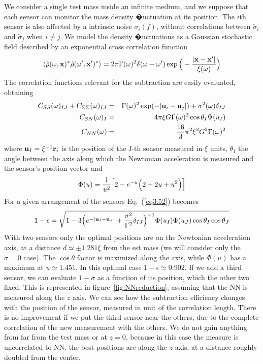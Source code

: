We consider a single test mass inside an infinite medium, and we suppose that each sensor can monitor the mass density �uctuation at its position. The $i$th sensor is also affected by a intrinsic noise $\sigma_{i}(f)$, without correlations between $\tilde{\sigma}_{i}$ and $\tilde{\sigma}_{j}$ when $i\neq j$. We model the density �uctuations as a Gaussian stochastic field described by an exponential cross correlation function
\begin{eqnarray}
		\langle\tilde{\rho}(\omega,{\bf x})^{*}\tilde{\rho}(\omega',{\bf x}')^{*}\rangle=2\pi\Gamma(\omega)^{2}\delta(\omega-\omega')\exp\Big{(}-\frac{|{\bf x}-{\bf x'}|}{\xi(\omega)}\Big{)}
		\label{eq3.53}
\end{eqnarray}
The correlation functions relevant for the subtraction are easily evaluated, obtaining
\begin{eqnarray}
		C_{SS}(\omega)_{IJ}+C_{\Sigma\Sigma}(\omega)_{IJ}&=&\Gamma(\omega)^{2}\exp(-|{\bf u}_{i}-{\bf u}_{j}|)+\sigma^{2}(\omega)\delta_{IJ}\\
		C_{SN}(\omega)_{I}&=&4\pi\xi G\Gamma(\omega)^{2}\cos\theta_{I}\Psi(u_{I})\\
		C_{NN}(\omega)&=&\frac{16}{3}\pi^{2}\xi^{2}G^{2}\Gamma(\omega)^{2}
		\label{eq3.54}
\end{eqnarray}
where ${\bf u}_{I}=\xi^{-1}{\bf r}_{i}$ is the position of the $I$-th sensor measured in $\xi$ units, $\theta_{I}$ the angle between the axis along which the Newtonian acceleration is measured and the sensor's position vector and
\begin{eqnarray}
		\Phi(u)=\frac{1}{u^{2}}\Big{[}2-e^{-u}\Big{(}2+2u+u^{2}\Big{)}\Big{]}
		\label{eq3.55}
\end{eqnarray}
For a given arrangement of the sensors Eq.~(\ref{eq3.52}) becomes
\begin{eqnarray}
		1-\epsilon=\sqrt{1-3\Big{(}e^{-|{\bf u}_{I}-{\bf u}_{J}|}+\frac{\sigma^{2}}{\Gamma^{2}}\delta_{IJ}\Big{)}^{-1}\Phi(u_{I})\Phi(u_{J})\cos\theta_{I}\cos\theta_{J}}
		\label{eq3.56}
\end{eqnarray}		
With two sensors only the optimal positions are on the Newtonian acceleration axis, at a distance $d\simeq \pm 1.281 \xi$ from the est mass (we will consider only the $\sigma=0$ case). The $\cos\theta$ factor is maximized along the axis, while $\Phi(u)$ has a maximum at $u\simeq1.451$. In this optimal case $1-\epsilon\simeq0.902$. If we add a third sensor, we can evaluate $1-\sigma$ as a function of its position, which the other two fixed. This is represented in figure~\ref{fig:NNreduction}, assuming that the NN is measured along the $z$ axis. We can see how the subtraction efficiency changes with the position of the sensor, measured in unit of the correlation length. There is no improvement if we put the third sensor near the others, due to the complete correlation of the new measurement with the others. We do not gain anything from far from the test mass or at $z=0$, because in this case the measure is uncorrelated to NN. the best positions are along the $z$ axis, at a distance roughly doubled from the center. 

